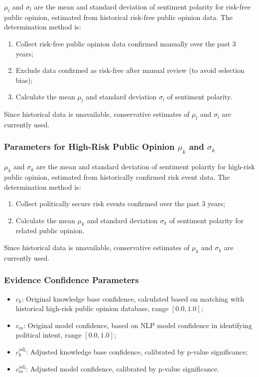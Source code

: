 \documentclass[11pt,a4paper]{report}
\begin{document}
$\mu_l$ and $\sigma_l$ are the mean and standard deviation of sentiment polarity for risk-free public opinion, estimated from historical risk-free public opinion data. The determination method is:
\begin{enumerate}
    \item Collect risk-free public opinion data confirmed manually over the past 3 years;
    \item Exclude data confirmed as risk-free after manual review (to avoid selection bias);
    \item Calculate the mean $\mu_l$ and standard deviation $\sigma_l$ of sentiment polarity.
\end{enumerate}

Since historical data is unavailable, conservative estimates of $\mu_l$ and $\sigma_l$ are currently used.

\subsubsection{Parameters for High-Risk Public Opinion $\mu_k$ and $\sigma_k$}

$\mu_k$ and $\sigma_k$ are the mean and standard deviation of sentiment polarity for high-risk public opinion, estimated from historically confirmed risk event data. The determination method is:
\begin{enumerate}
    \item Collect politically secure risk events confirmed over the past 3 years;
    \item Calculate the mean $\mu_k$ and standard deviation $\sigma_k$ of sentiment polarity for related public opinion.
\end{enumerate}

Since historical data is unavailable, conservative estimates of $\mu_k$ and $\sigma_k$ are currently used.

\subsubsection{Evidence Confidence Parameters}

\begin{itemize}
    \item $c_k$: Original knowledge base confidence, calculated based on matching with historical high-risk public opinion database, range $[0.0, 1.0]$;
    \item $c_m$: Original model confidence, based on NLP model confidence in identifying political intent, range $[0.0, 1.0]$;
    \item $c_k^{\text{adj}}$: Adjusted knowledge base confidence, calibrated by p-value significance;
    \item $c_m^{\text{adj}}$: Adjusted model confidence, calibrated by p-value significance.
\end{itemize}
\end{document}

